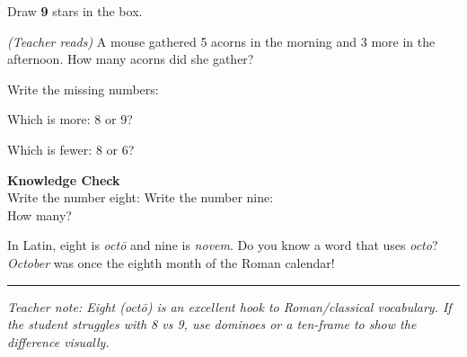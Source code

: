 \documentclass[12pt,letterpaper]{article}
\begin{document}
\vspace{10pt}
\prob Draw \textbf{9} stars in the box.\\[4pt]
\noindent\fbox{\rule{0pt}{2.4cm}\hspace{11cm}}

\vspace{10pt}
\prob \textit{(Teacher reads)} A mouse gathered 5 acorns in the morning
and 3 more in the afternoon.
How many acorns did she gather? \quad\ansblank

\vspace{10pt}
\prob Write the missing numbers:\\[6pt]
\hspace{2cm}{\Large 6 \quad \ansblank \quad 8 \quad \ansblank \quad 10}

\vspace{10pt}
\prob Which is more: 8 or 9? \quad\ansblank

\vspace{10pt}
\prob Which is fewer: 8 or 6? \quad\ansblank

\goldrule

\begin{checkbox}
\noindent\textbf{\color{sd-green}Knowledge Check}\\[4pt]
\setcounter{probnum}{0}
\prob Write the number eight: \quad\ansblank \quad
  Write the number nine: \quad\ansblank\\[8pt]
\prob \onedot\onedot\onedot\onedot\onedot\onedot\onedot\onedot\onedot\quad
  How many? \quad\ansblank
\end{checkbox}

\vfill
{}
In Latin, eight is \textit{octō} and nine is \textit{novem}.
Do you know a word that uses \textit{octo}? \textit{October} was once the eighth month of the Roman calendar!

\vspace{4pt}\hrule\vspace{3pt}
{\footnotesize\color{gray}\textit{Teacher note: Eight (octō) is an excellent hook to Roman/classical vocabulary.
  If the student struggles with 8 vs 9, use dominoes or a ten-frame to show the difference visually.}}
\end{document}

